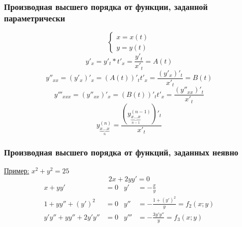 \documentclass[12pt]{article}
\begin{document}
    \subsubsection*{Производная высшего порядка от функции, заданной параметрически}
    \[ \begin{cases}
        x = x(t)\\
        y = y(t)
    \end{cases} \]
    \[ y'_x = y'_t * t'_x = \frac{y'_t}{x'_t} = A(t) \]
    \[ y''_{xx} = (y'_x)'_x = (A(t))'_t t'_x = \frac{(y'_x)'_t}{x'_t} = B(t) \]
    \[ y'''_{xxx} = (y''_{xx})'_x = (B(t))'_t t'_x = \frac{(y''_{xx})'_t}{x'_t} \]
    \[ \boxed{y^{(n)}_{\underbrace{x \dots x}_{n}} = \frac{(y^{(n-1)}_{\underbrace{x \dots x}_{n-1}})'_t}{x'_t}} \]
    \subsubsection*{Производная высшего порядка от функций, заданных неявно}
    \underline{Пример:} $x^2 + y^2 = 25$
    \[ 2x + 2yy' = 0 \]
    \begin{align*}
        x + yy' &= 0 & y' &= -\frac{x}{y}\\
        1 + yy'' + (y')^2 &= 0 & y'' &= -\frac{1+(y')^2}{y} = f_2(x;y)\\
        y'y'' + yy'' + 2y'y'' &= 0 & y''' &= -\frac{3y'y''}{y} = f_3(x; y)
    \end{align*}
\end{document}
